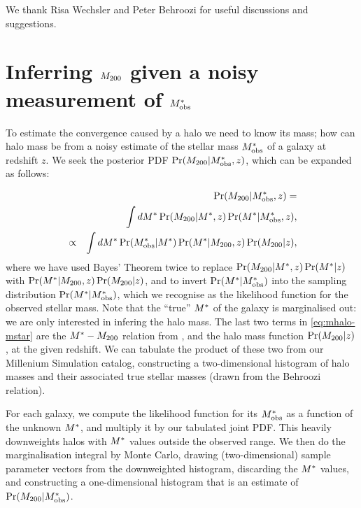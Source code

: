 \documentclass[useAMS,usenatbib]{mn2e}
\begin{document}
We thank Risa Wechsler and Peter Behroozi 
for useful discussions and suggestions.



\appendix


\section{Inferring $M_{200}$ given a noisy measurement of $M^{*}_{\rm obs}$}
\label{appendix:MSMH}

To estimate the convergence caused by a halo we need to know its mass; how can 
halo mass be \infered from a noisy estimate of the stellar mass $M^{*}_{\rm obs}$
of a galaxy at redshift $z$. We seek the posterior
PDF $\Pr(M_{200}|M^{*}_{\rm obs},z)$, which can be expanded as follows:

\begin{eqnarray}
&& \Pr(M_{200}|M^{*}_{\rm obs},z) = \notag\\
&& \int dM^{*} \Pr(M_{200}|M^{*},z) \Pr(M^{*}|M^{*}_{\rm obs},z), \notag\\
&\propto& \int dM^{*} \Pr(M^{*}_{\rm obs}|M^{*}) \Pr(M^{*}|M_{200},z) \Pr(M_{200}|z),
\label{eq:mhalo-mstar}
\end{eqnarray}
where we have used Bayes' Theorem twice to replace
$\Pr(M_{200}|M^{*},z) \Pr(M^{*}|z)$ with 
$\Pr(M^{*}|M_{200},z) \Pr(M_{200}|z)$, and 
to invert $\Pr(M^{*}|M^{*}_{\rm obs})$ into the sampling
distribution $\Pr(M^{*}|M^{*}_{\rm obs})$, which we recognise as the likelihood
function for the observed stellar mass. Note that the ``true'' $M^{*}$ of the
galaxy is marginalised out: we are only interested in infering the halo
mass. The last two terms in
\eqref{eq:mhalo-mstar} are the $M^{*}-M_{200}$ relation from
\citet{BehrooziEtal2010}, and the halo mass function $\Pr(M_{200}|z)$, at the
given redshift. We can
tabulate the product of these two from our Millenium Simulation catalog,
constructing a two-dimensional histogram of halo masses and their associated
true stellar masses (drawn from the Behroozi relation). 

For each galaxy, we compute the likelihood function for its $M^{*}_{\rm obs}$ as a
function of the unknown $M^{*}$, and multiply it by our tabulated joint PDF.
This heavily downweights halos with $M^{*}$ values outside the observed
range. We then do the marginalisation integral by Monte Carlo, drawing
(two-dimensional) sample parameter vectors
from the downweighted histogram, discarding the $M^{*}$ values, and
constructing a one-dimensional histogram that is an estimate of
$\Pr(M_{200}|M^{*}_{\rm obs})$.
\end{document}
